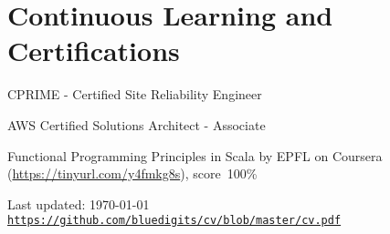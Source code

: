 \documentclass[letterpaper]{article}
\def\footerlink{https://github.com/bluedigits/cv/blob/master/cv.pdf}
\newenvironment{no-indent-itemize}{
  \begin{list}{}{
    \setlength{\leftmargin}{0em}
  }
}{
  \end{list}
}
\begin{document}
\section*{Continuous Learning and Certifications}
\begin{no-indent-itemize}
  \item CPRIME - Certified Site Reliability Engineer
  \item AWS Certified Solutions Architect - Associate
  \item Functional Programming Principles in Scala by EPFL on Coursera
        (\href{https://tinyurl.com/y4fmkg8s}{https://tinyurl.com/y4fmkg8s}), score~100\%
\end{no-indent-itemize}

\bigskip
\begin{center}
  \begin{footnotesize}
    Last updated: \today \\
    \href{\footerlink}{\texttt{\footerlink}}
  \end{footnotesize}
\end{center}
\end{document}
